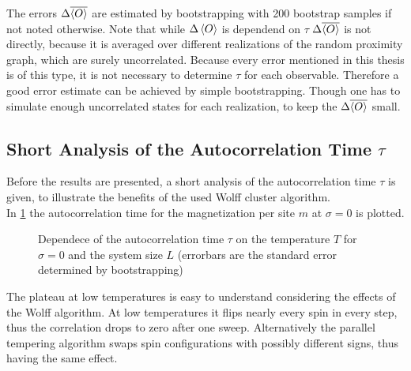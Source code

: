 The errors \(\Delta \overline{\left< O \right>}\) are estimated by bootstrapping
\cite{Bootstrap} with 200 bootstrap samples if not noted otherwise.
Note that while \(\Delta \left< O \right>\) is dependend on \(\tau\) \cite[p. 151]{Katzgraber2011}
\(\Delta \overline{\left< O \right>}\) is not directly, because it is averaged
over different realizations of the random proximity graph, which are
surely uncorrelated.
Because every error mentioned in this thesis is of this type, it is not
necessary to determine \(\tau\) for each observable. Therefore a good
error estimate can be achieved by simple bootstrapping. Though one has
to simulate enough uncorrelated states for each realization, to keep
the \(\Delta \overline{\left< O \right>}\) small.

\subsection{Short Analysis of the Autocorrelation Time  $\tau$}
    Before the results are presented, a short analysis of the
    autocorrelation time \(\tau\) is given, to illustrate the benefits
    of the used Wolff cluster algorithm.\\
    In \ref{fig:autocorr}
    the autocorrelation time for the magnetization per site \(m\) at \(\sigma=0\) is plotted.
    \begin{figure}[htbp]
        \centering
        \caption[The autocorrelation time $\tau$]
        {
            Dependece of the autocorrelation time $\tau$ on
             the temperature $T$ for
                $\sigma=0$ and
             the system size $L$ (errorbars
                are the standard error determined by bootstrapping)
        }
        \label{fig:autocorr}
    \end{figure}
    The plateau at low temperatures is easy to understand considering the
    effects of the Wolff algorithm. At low temperatures it flips nearly every
    spin in every step, thus the correlation drops to zero after one sweep.
    Alternatively the parallel tempering algorithm swaps spin configurations
    with possibly different signs, thus having the same effect.
